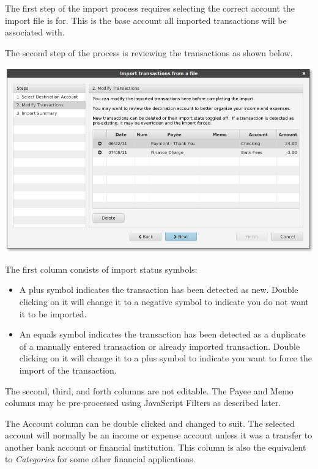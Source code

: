 \documentclass[letterpaper,12pt]{book}
\begin{document}
    The first step of the import process requires selecting the correct account the
    import file is for. This is the base account all imported transactions will be
    associated with.


    The second step of the process is reviewing the transactions as shown below.

    \includegraphics[width=0.8\linewidth]{images/importWizard2}

    The first column consists of import status symbols:

    \begin{itemize}
        \item A plus symbol indicates the transaction has been detected as new. Double
        clicking on it will change it to a negative symbol to indicate you do not want
        it to be imported.
        \item An equals symbol indicates the transaction has been detected as a duplicate of
        a manually entered transaction or already imported transaction. Double
        clicking on it will change it to a plus symbol to indicate you want to force
        the import of the transaction.
    \end{itemize}

    The second, third, and forth columns are not editable. The Payee and Memo
    columns may be pre-processed using JavaScript Filters as described later.

    The Account column can be double clicked and changed to suit. The selected
    account will normally be an income or expense account unless it was a transfer
    to another bank account or financial institution. This column is also the
    equivalent to \textit{Categories} for some other financial applications.
\end{document}
